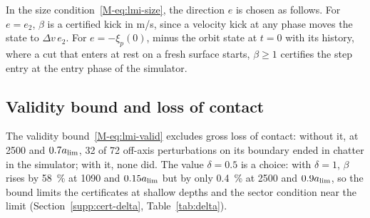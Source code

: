 In the size condition~\eqref{M-eq:lmi-size}, the direction $e$ is chosen as follows. For $e=e_2$, $\beta$ is a certified kick in m/s, since a velocity kick at any phase moves the state to $\Delta v\,e_2$. For $e=-\xi_p(0)$, minus the orbit state at $t=0$ with its history, where a cut that enters at rest on a fresh surface starts, $\beta\ge1$ certifies the step entry at the entry phase of the simulator.

\subsection{Validity bound and loss of contact}\label{supp:std-contact}

The validity bound~\eqref{M-eq:lmi-valid} excludes gross loss of contact: without it, at \SI{2500}{\rpm} and $0.7a_{\lim}$, 32 of 72 off-axis perturbations on its boundary ended in chatter in the simulator; with it, none did. The value $\delta=0.5$ is a choice: with $\delta=1$, $\beta$ rises by \SI{58}{\percent} at \SI{1090}{\rpm} and $0.15a_{\lim}$ but by only \SI{0.4}{\percent} at \SI{2500}{\rpm} and $0.9a_{\lim}$, so the bound limits the certificates at shallow depths and the sector condition near the limit (Section~\ref{supp:cert-delta}, Table~\ref{tab:delta}).

